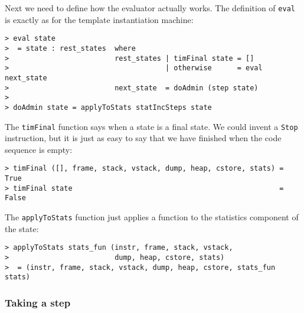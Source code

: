 Next we need to define how the evaluator actually works.
The definition of
\mbox{\tt eval} is exactly as for the template instantiation machine:
\begin{verbatim}
> eval state
>  = state : rest_states  where
>                         rest_states | timFinal state = []
>                                     | otherwise      = eval next_state
>                         next_state  = doAdmin (step state)
>
> doAdmin state = applyToStats statIncSteps state
\end{verbatim}
%
%
The \mbox{\tt timFinal} function says when a state is a final state.
We could invent a \mbox{\tt Stop} instruction, but it
is just as easy
to say that we have finished when the code sequence is empty:
\begin{verbatim}
> timFinal ([], frame, stack, vstack, dump, heap, cstore, stats) = True
> timFinal state                                                 = False
\end{verbatim}
%
%
The \mbox{\tt applyToStats} function just applies a function to the
statistics component of the state:
\begin{verbatim}
> applyToStats stats_fun (instr, frame, stack, vstack,
>                         dump, heap, cstore, stats)
>  = (instr, frame, stack, vstack, dump, heap, cstore, stats_fun stats)
\end{verbatim}
%

\subsubsection{Taking a step}

